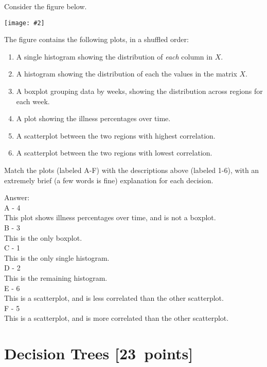 \documentclass{article}
\newcommand{\blu}[1]{{\textcolor{blu}{#1}}}
\newenvironment{answer}{\par\begingroup\color{gre}Answer: }{\endgroup}
\let\ask\blu
\newcommand\pts[1]{\textcolor{pointscolour}{[#1~points]}}
\newcommand{\centerfig}[2]{\begin{center}\texttt{[image: \#2]}\end{center}}
\begin{document}
  Consider the figure below.

  \centerfig{.9}{./figs/visualize-unlabeled}
  \newpage
  The figure contains the following plots, in a shuffled order:
  \begin{enumerate}
  \item A single histogram showing the distribution of \emph{each} column in $X$.
  \item A histogram showing the distribution of each the values in the matrix $X$.
  \item A boxplot grouping data by weeks, showing the distribution across regions for each week.
  \item A plot showing the illness percentages over time.
  \item A scatterplot between the two regions with highest correlation.
  \item A scatterplot between the two regions with lowest correlation.
  \end{enumerate}

  \ask{Match the plots (labeled A-F) with the descriptions above (labeled 1-6), with an extremely brief (a few words is fine) explanation for each decision.}

  \begin{answer}\\
  A - 4 \\
  This plot shows illness percentages over time, and is not a boxplot. \\
  B - 3 \\
  This is the only boxplot. \\
  C - 1 \\
  This is the only single histogram. \\
  D - 2 \\
  This is the remaining histogram. \\
  E - 6 \\
  This is a scatterplot, and is less correlated than the other scatterplot. \\
  F - 5 \\
  This is a scatterplot, and is more correlated than the other scatterplot.
  \end{answer}



  \clearpage\section{Decision Trees \pts{23}}
\end{document}
